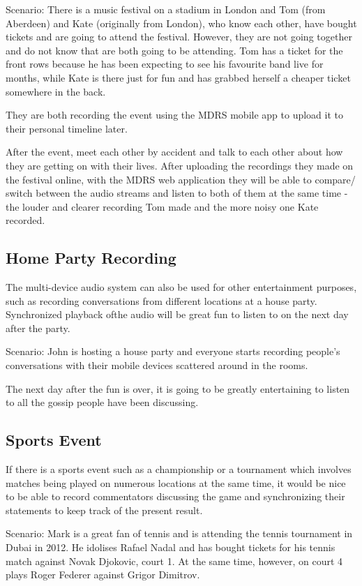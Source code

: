 \documentclass{l3proj}
\begin{document}
Scenario: There is a music festival on a stadium in London and Tom (from Aberdeen) and Kate (originally from London), who know each other, have bought tickets and are going to attend the festival. However, they are not going together and do not know that are both going to be attending. Tom has a ticket for the front rows because he has been expecting to see his favourite band live for months, while Kate is there just for fun and has grabbed herself a cheaper ticket somewhere in the back.

They are both recording the event using the MDRS mobile app to upload it to their personal timeline later.

After the event, meet each other by accident and talk to each other about how they are getting on with their lives. After uploading the recordings they made on the festival online, with the MDRS web application they will be able to compare/ switch between the audio streams and listen to both of them at the same time - the louder and clearer recording Tom made and the more noisy one Kate recorded.

\subsection{Home Party Recording} The multi-device audio system can also be used for other entertainment purposes, such as recording conversations from different locations at a house party. Synchronized playback ofthe audio will be great fun to listen to on the next day after the party.

Scenario: John is hosting a house party and everyone starts recording people's conversations with their mobile devices scattered around in the rooms.

The next day after the fun is over, it is going to be greatly entertaining to listen to all the gossip people have been discussing.

\subsection{Sports Event} If there is a sports event such as a championship or a tournament which involves matches being played on numerous locations at the same time, it would be nice to be able to record commentators discussing the game and synchronizing their statements to keep track of the present result.

Scenario: Mark is a great fan of tennis and is attending the tennis tournament in Dubai in 2012. He idolises Rafael Nadal and has bought tickets for his tennis match against Novak Djokovic, court 1. At the same time, however, on court 4 plays Roger Federer against Grigor Dimitrov.
\end{document}
